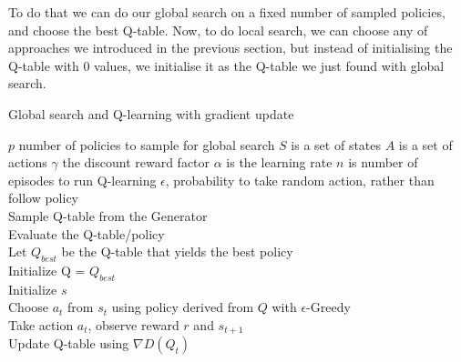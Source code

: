 To do that we can do our global search on a fixed number of sampled policies, and choose the best Q-table. 
Now, to do local search, we can choose any of approaches we introduced in the previous section, but instead of initialising the Q-table with 0 values, we initialise it as the Q-table we just found with global search.

\begin{algorithm}[H]
\caption{Global search and Q-learning with gradient update}
\begin{algorithmic}[1]
\Require
	\State $p$ number of policies to sample for global search
 	\State $S$ is a set of states
 	\State $A$ is a set of actions
 	\State $\gamma$ the discount reward factor
 	\State $\alpha$ is the learning rate
 	\State $n$ is number of episodes to run Q-learning
 	\State $\epsilon$, probability to take random action, rather than follow policy
 {}
\\ \qquad Sample Q-table from the Generator
\\ \qquad Evaluate the Q-table/policy
\EndFor
\\ Let $Q_{best}$ be the Q-table that yields the best policy
\EndProcedure
{} {}
\\Initialize Q = $Q_{best}$
\\ \qquad Initialize $s$
\\ \qquad \qquad Choose $a_t$ from $s_t$ using policy derived from $Q$ with $\epsilon$-Greedy
\\ \qquad \qquad Take action $a_t$, observe reward $r$ and $s_{t+1}$
\\ \qquad \qquad Update Q-table using $\nabla D(Q_{t})$
\EndFor
\EndFor
\EndProcedure
\end{algorithmic}
\end{algorithm}


